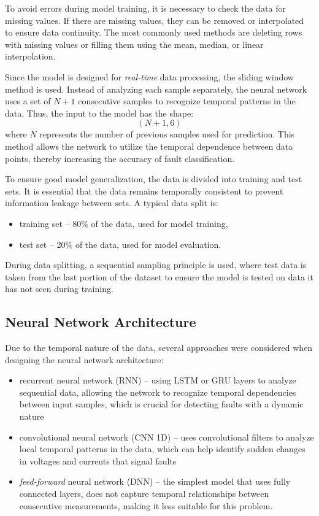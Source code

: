\documentclass[11pt]{IEEEtran}
\begin{document}
To avoid errors during model training, it is necessary to check the data for missing values. If there are missing values, they can be removed or interpolated to ensure data continuity. The most commonly used methods are deleting rows with missing values or filling them using the mean, median, or linear interpolation.

Since the model is designed for \textit{real-time} data processing, the sliding window method is used. Instead of analyzing each sample separately, the neural network uses a set of \(N+1\) consecutive samples to recognize temporal patterns in the data. Thus, the input to the model has the shape:
\vskip -10pt
\begin{equation}
(N+1, 6)
\end{equation}
where $N$ represents the number of previous samples used for prediction. This method allows the network to utilize the temporal dependence between data points, thereby increasing the accuracy of fault classification.

To ensure good model generalization, the data is divided into training and test sets. It is essential that the data remains temporally consistent to prevent information leakage between sets. A typical data split is:
\begin{itemize}
    \item training set – 80\% of the data, used for model training,
    \item test set – 20\% of the data, used for model evaluation.
\end{itemize}

During data splitting, a sequential sampling principle is used, where test data is taken from the last portion of the dataset to ensure the model is tested on data it has not seen during training.

\subsection{Neural Network Architecture}

Due to the temporal nature of the data, several approaches were considered when designing the neural network architecture:

\begin{itemize}
    \item recurrent neural network (RNN) – using LSTM or GRU layers to analyze sequential data, allowing the network to recognize temporal dependencies between input samples, which is crucial for detecting faults with a dynamic nature
    
    \item convolutional neural network (CNN 1D) – uses convolutional filters to analyze local temporal patterns in the data, which can help identify sudden changes in voltages and currents that signal faults
    
    \item \textit{feed-forward} neural network (DNN) – the simplest model that uses fully connected layers, does not capture temporal relationships between consecutive measurements, making it less suitable for this problem.
\end{itemize}
\end{document}
